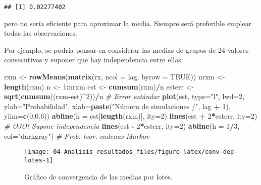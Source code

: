 \documentclass[
]{book}
\newenvironment{Shaded}{\begin{snugshade}}{\end{snugshade}}
\newcommand{\CommentTok}[1]{\textcolor[rgb]{0.56,0.35,0.01}{\textit{#1}}}
\newcommand{\DataTypeTok}[1]{\textcolor[rgb]{0.13,0.29,0.53}{#1}}
\newcommand{\DecValTok}[1]{\textcolor[rgb]{0.00,0.00,0.81}{#1}}
\newcommand{\FloatTok}[1]{\textcolor[rgb]{0.00,0.00,0.81}{#1}}
\newcommand{\KeywordTok}[1]{\textcolor[rgb]{0.13,0.29,0.53}{\textbf{#1}}}
\newcommand{\NormalTok}[1]{#1}
\newcommand{\OperatorTok}[1]{\textcolor[rgb]{0.81,0.36,0.00}{\textbf{#1}}}
\newcommand{\OtherTok}[1]{\textcolor[rgb]{0.56,0.35,0.01}{#1}}
\newcommand{\StringTok}[1]{\textcolor[rgb]{0.31,0.60,0.02}{#1}}
\theoremstyle{break}
\theoremstyle{definition}
\theoremstyle{definition}
\theoremstyle{definition}
\theoremstyle{remark}
\begin{document}
\begin{verbatim}
## [1] 0.02277402
\end{verbatim}

pero no sería eficiente para aproximar la media. Siempre será preferible emplear
todas las observaciones.

Por ejemplo, se podría pensar en considerar las medias de grupos de 24 valores
consecutivos y suponer que hay independencia entre ellas:

\begin{Shaded}
\begin{Highlighting}[]
\NormalTok{rxm <-}\StringTok{ }\KeywordTok{rowMeans}\NormalTok{(}\KeywordTok{matrix}\NormalTok{(rx, }\DataTypeTok{ncol =}\NormalTok{ lag, }\DataTypeTok{byrow =} \OtherTok{TRUE}\NormalTok{))}
\NormalTok{nrxm <-}\StringTok{ }\KeywordTok{length}\NormalTok{(rxm)}
\NormalTok{n <-}\StringTok{ }\DecValTok{1}\OperatorTok{:}\NormalTok{nrxm}
\NormalTok{est <-}\StringTok{ }\KeywordTok{cumsum}\NormalTok{(rxm)}\OperatorTok{/}\NormalTok{n}
\NormalTok{esterr <-}\StringTok{ }\KeywordTok{sqrt}\NormalTok{(}\KeywordTok{cumsum}\NormalTok{((rxm}\OperatorTok{-}\NormalTok{est)}\OperatorTok{^}\DecValTok{2}\NormalTok{))}\OperatorTok{/}\NormalTok{n  }\CommentTok{# Error estándar}
\KeywordTok{plot}\NormalTok{(est, }\DataTypeTok{type=}\StringTok{"l"}\NormalTok{, }\DataTypeTok{lwd=}\DecValTok{2}\NormalTok{, }\DataTypeTok{ylab=}\StringTok{"Probabilidad"}\NormalTok{, }
     \DataTypeTok{xlab=}\KeywordTok{paste}\NormalTok{(}\StringTok{"Número de simulaciones /"}\NormalTok{, lag }\OperatorTok{+}\StringTok{ }\DecValTok{1}\NormalTok{), }\DataTypeTok{ylim=}\KeywordTok{c}\NormalTok{(}\DecValTok{0}\NormalTok{,}\FloatTok{0.6}\NormalTok{))}
\KeywordTok{abline}\NormalTok{(}\DataTypeTok{h =}\NormalTok{ est[}\KeywordTok{length}\NormalTok{(rxm)], }\DataTypeTok{lty=}\DecValTok{2}\NormalTok{)}
\KeywordTok{lines}\NormalTok{(est }\OperatorTok{+}\StringTok{ }\DecValTok{2}\OperatorTok{*}\NormalTok{esterr, }\DataTypeTok{lty=}\DecValTok{2}\NormalTok{) }\CommentTok{# OJO! Supone independencia}
\KeywordTok{lines}\NormalTok{(est }\OperatorTok{-}\StringTok{ }\DecValTok{2}\OperatorTok{*}\NormalTok{esterr, }\DataTypeTok{lty=}\DecValTok{2}\NormalTok{)}
\KeywordTok{abline}\NormalTok{(}\DataTypeTok{h =} \DecValTok{1}\OperatorTok{/}\DecValTok{3}\NormalTok{, }\DataTypeTok{col=}\StringTok{"darkgray"}\NormalTok{)     }\CommentTok{# Prob. teor. cadenas Markov}
\end{Highlighting}
\end{Shaded}

\begin{figure}[!htb]

{\centering \texttt{[image: 04-Analisis\_resultados\_files/figure-latex/conv-dep-lotes-1]} 

}

\caption{Gráfico de convergencia de las medias por lotes.}\label{fig:conv-dep-lotes}
\end{figure}
\end{document}
